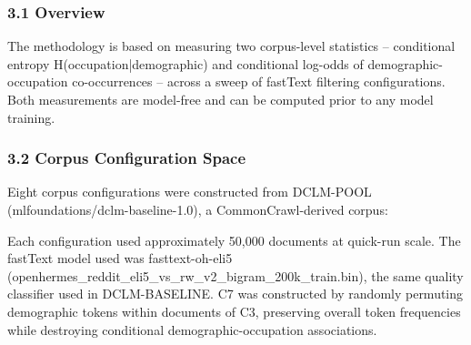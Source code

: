 
\subsubsection{3.1 Overview}

The methodology is based on measuring two corpus-level statistics -- conditional entropy H(occupation|demographic) and conditional log-odds of demographic-occupation co-occurrences -- across a sweep of fastText filtering configurations. Both measurements are model-free and can be computed prior to any model training.

\subsubsection{3.2 Corpus Configuration Space}

Eight corpus configurations were constructed from DCLM-POOL (mlfoundations/dclm-baseline-1.0), a CommonCrawl-derived corpus:

\begin{table}[htbp]
\centering
{}
\end{table}

Each configuration used approximately 50,000 documents at quick-run scale. The fastText model used was fasttext-oh-eli5 (openhermes\_reddit\_eli5\_vs\_rw\_v2\_bigram\_200k\_train.bin), the same quality classifier used in DCLM-BASELINE. C7 was constructed by randomly permuting demographic tokens within documents of C3, preserving overall token frequencies while destroying conditional demographic-occupation associations.

